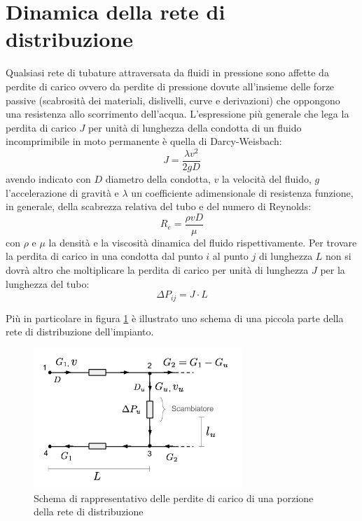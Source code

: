\documentclass[laurea,oneside,11pt]{USiena_tesiLM}
\begin{document}
\section{Dinamica della rete di distribuzione}
Qualsiasi rete di tubature attraversata da fluidi in pressione sono affette da perdite di carico ovvero da perdite di pressione dovute all'insieme delle forze passive (scabrosità dei materiali, dislivelli, curve e derivazioni) che oppongono una resistenza allo scorrimento dell'acqua. L'espressione più generale che lega la perdita di carico $J$ per unità di lunghezza della condotta di un fluido incomprimibile in moto permanente è quella di Darcy-Weisbach:
\begin{equation}
J = \frac{\lambda v^2}{2 g D}
\end{equation}
avendo indicato con $D$ diametro della condotta, $v$ la velocità del fluido, $g$ l'accelerazione di gravità e $\lambda$ un coefficiente adimensionale di resistenza funzione, in generale, della scabrezza relativa del tubo e del numero di Reynolds:
\begin{equation}
R_e = \frac{\rho v D}{\mu}
\end{equation}
con $\rho$ e $\mu$ la densità e la viscosità dinamica del fluido rispettivamente. 
Per trovare la perdita di carico in una condotta dal punto $i$ al punto $j$ di lunghezza $L$ non si dovrà altro che moltiplicare la perdita di carico per unità di lunghezza $J$ per la lunghezza del tubo:
\begin{equation}
\Delta P_{ij} = J \cdot L
\end{equation} 
 
Più in particolare in figura \ref{fig:perdite_carico} è illustrato uno schema di una piccola parte della rete di distribuzione dell'impianto.

\begin{figure}[h]
\centering
\includegraphics[width=0.70\textwidth]{figure/perdite_carico} %
\caption{Schema di rappresentativo delle perdite di carico di una porzione della rete di distribuzione}
\label{fig:perdite_carico}

\end{figure}
\end{document}
